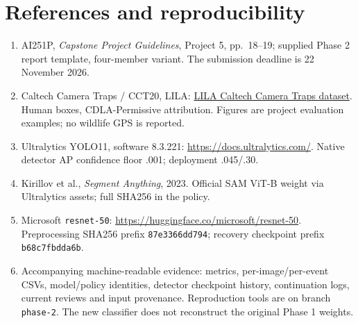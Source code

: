 \documentclass[11pt,a4paper]{article}
\begin{document}
\section*{References and reproducibility}
\begin{enumerate}[leftmargin=1.5em,itemsep=2pt]
\item AI251P, \emph{Capstone Project Guidelines}, Project 5, pp.\ 18--19; supplied Phase 2 report template, four-member variant. The submission deadline is 22 November 2026.
\item Caltech Camera Traps / CCT20, LILA: \href{https://lila.science/datasets/caltech-camera-traps}{LILA Caltech Camera Traps dataset}. Human boxes, CDLA-Permissive attribution. Figures are project evaluation examples; no wildlife GPS is reported.
\item Ultralytics YOLO11, software 8.3.221: \url{https://docs.ultralytics.com/}. Native detector AP confidence floor .001; deployment .045/.30.
\item Kirillov et al., \emph{Segment Anything}, 2023. Official SAM ViT-B weight via Ultralytics assets; full SHA256 in the policy.
\item Microsoft \texttt{resnet-50}: \url{https://huggingface.co/microsoft/resnet-50}. Preprocessing SHA256 prefix \texttt{87e3366dd794}; recovery checkpoint prefix \texttt{b68c7fbdda6b}.
\item Accompanying machine-readable evidence: metrics, per-image/per-event CSVs, model/policy identities, detector checkpoint history, continuation logs, current reviews and input provenance. Reproduction tools are on branch \texttt{phase-2}. The new classifier does not reconstruct the original Phase 1 weights.
\end{enumerate}
\end{document}
